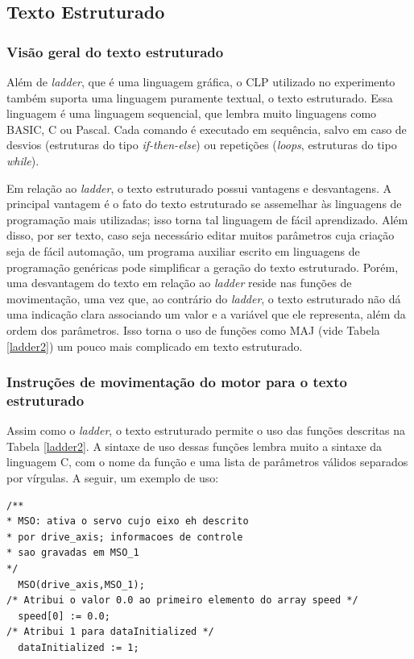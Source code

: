 \subsection{Texto Estruturado}
\subsubsection{Visão geral do texto estruturado}
Além de \textit{ladder}, que é uma linguagem gráfica, o CLP utilizado no experimento também suporta uma linguagem puramente textual, o texto estruturado. Essa linguagem é uma linguagem sequencial, que lembra muito linguagens como BASIC, C ou Pascal. Cada comando é executado em sequência, salvo em caso de desvios (estruturas do tipo \textit{if-then-else}) ou repetições (\textit{loops}, estruturas do tipo \textit{while}).

Em relação ao \textit{ladder}, o texto estruturado possui vantagens e desvantagens. A principal vantagem é o fato do texto estruturado se assemelhar às linguagens de programação mais utilizadas; isso torna tal linguagem de fácil aprendizado. Além disso, por ser texto, caso seja necessário editar muitos parâmetros cuja criação seja de fácil automação, um programa auxiliar escrito em linguagens de programação genéricas pode simplificar a geração do texto estruturado. Porém, uma desvantagem do texto em relação ao \textit{ladder} reside nas funções de movimentação, uma vez que, ao contrário do \textit{ladder}, o texto estruturado não dá uma indicação clara associando um valor e a variável que ele representa, além da ordem dos parâmetros. Isso torna o uso de funções como MAJ (vide Tabela \ref{ladder2}) um pouco mais complicado em texto estruturado.

\subsubsection{Instruções de movimentação do motor para o texto estruturado}
Assim como o \textit{ladder}, o texto estruturado permite o uso das funções descritas na Tabela \ref{ladder2}. A sintaxe de uso dessas funções lembra muito a sintaxe da linguagem C, com o nome da função e uma lista de parâmetros válidos separados por vírgulas. A seguir, um exemplo de uso:
 
\begin{lstlisting}
/**
* MSO: ativa o servo cujo eixo eh descrito
* por drive_axis; informacoes de controle
* sao gravadas em MSO_1
*/
  MSO(drive_axis,MSO_1);
/* Atribui o valor 0.0 ao primeiro elemento do array speed */
  speed[0] := 0.0; 
/* Atribui 1 para dataInitialized */
  dataInitialized := 1;
\end{lstlisting}

